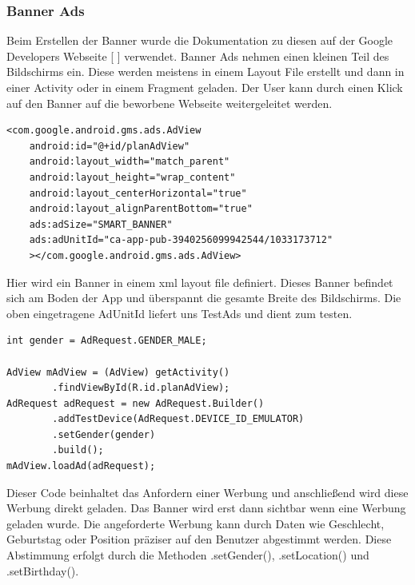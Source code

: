 \documentclass[FIPLY_base.tex]{subfiles}
\begin{document}
\newpage
\subsubsection{Banner Ads}
Beim Erstellen der Banner wurde die Dokumentation zu diesen auf der Google Developers Webseite [ \cite{gdBanner}] verwendet. \newline 
Banner Ads nehmen einen kleinen Teil des Bildschirms ein. Diese werden meistens in einem Layout File erstellt und dann in einer Activity oder in einem Fragment geladen. Der User kann durch einen Klick auf den Banner auf die beworbene Webseite weitergeleitet werden.
\ \\
\begin{lstlisting}
<com.google.android.gms.ads.AdView
    android:id="@+id/planAdView"
    android:layout_width="match_parent"
    android:layout_height="wrap_content"
    android:layout_centerHorizontal="true"
    android:layout_alignParentBottom="true"
    ads:adSize="SMART_BANNER"
    ads:adUnitId="ca-app-pub-3940256099942544/1033173712"
    ></com.google.android.gms.ads.AdView>
\end{lstlisting}
Hier wird ein Banner in einem xml layout file definiert. Dieses Banner befindet sich am Boden der App und überspannt die gesamte Breite des Bildschirms.
Die oben eingetragene AdUnitId liefert uns TestAds und dient zum testen.
\ \\
\begin{lstlisting}
int gender = AdRequest.GENDER_MALE;

AdView mAdView = (AdView) getActivity()
        .findViewById(R.id.planAdView);
AdRequest adRequest = new AdRequest.Builder()
        .addTestDevice(AdRequest.DEVICE_ID_EMULATOR)
        .setGender(gender)
        .build();
mAdView.loadAd(adRequest);
\end{lstlisting}
Dieser Code beinhaltet das Anfordern einer Werbung und anschließend wird diese Werbung direkt geladen.
Das Banner wird erst dann sichtbar wenn eine Werbung geladen wurde.
Die angeforderte Werbung kann durch Daten wie Geschlecht, Geburtstag oder Position präziser auf den Benutzer abgestimmt werden.
Diese Abstimmung erfolgt durch die Methoden .setGender(), .setLocation() und .setBirthday().	

\newpage
\end{document}
